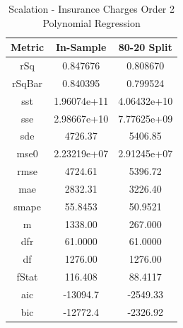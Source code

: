 \documentclass{article}
\begin{document}
\begin{table}[H]
\centering
\caption{Scalation - Insurance Charges Order 2 Polynomial Regression}
\label{tab:Scalation - Insurance Charges Order 2 Polynomial Regression}
\begin{tabular}{|c|c|c|} \hline 
Metric & In-Sample & 80-20 Split \\ \hline \hline 
rSq &0.847676 & 0.808670 \\ \hline 
rSqBar &0.840395 &      0.799524 \\ \hline 
sst &1.96074e+11 &      4.06432e+10 \\ \hline 
sse &2.98667e+10 &      7.77625e+09 \\ \hline 
sde &4726.37 &  5406.85 \\ \hline 
mse0 &2.23219e+07 &     2.91245e+07 \\ \hline 
rmse &4724.61 & 5396.72 \\ \hline 
mae &2832.31 &  3226.40 \\ \hline 
smape &55.8453 &        50.9521 \\ \hline 
m &1338.00 &    267.000 \\ \hline 
dfr &61.0000 &  61.0000 \\ \hline 
df &1276.00 &   1276.00 \\ \hline 
fStat &116.408 &        88.4117 \\ \hline 
aic &-13094.7 & -2549.33 \\ \hline 
bic &-12772.4 & -2326.92 \\ \hline 
\end{tabular}
\end{table}
\end{document}
